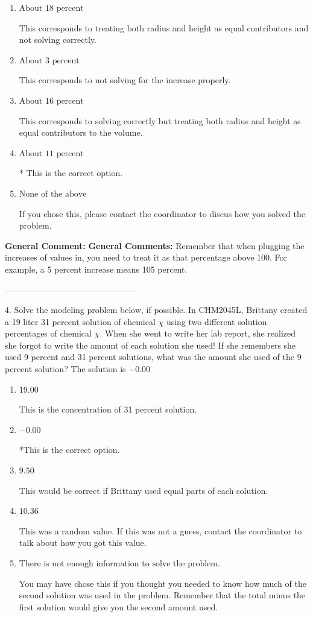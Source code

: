 \documentclass{extbook}[14pt]
\begin{document}
\begin{enumerate}[label=\Alph*.] 
\item $ \text{About } 18 \text{ percent} $ 

 This corresponds to treating both radius and height as equal contributors and not solving correctly. 
\item $ \text{About } 3 \text{ percent} $ 

 This corresponds to not solving for the increase properly. 
\item $ \text{About } 16 \text{ percent} $ 

 This corresponds to solving correctly but treating both radius and height as equal contributors to the volume. 
\item $ \text{About } 11 \text{ percent} $ 

 * This is the correct option. 
\item $ \text{None of the above} $ 

 If you chose this, please contact the coordinator to discus how you solved the problem. 
\end{enumerate} 
 
\textbf{General Comment:} \textbf{General Comments:} Remember that when plugging the increases of values in, you need to treat it as that percentage above 100. For example, a 5 percent increase means 105 percent. 

-----------------------------------------------

4. Solve the modeling problem below, if possible.
In CHM2045L, Brittany created a 19 liter 31 percent solution of chemical $\chi$ using two different solution percentages of chemical $\chi$. When she went to write her lab report, she realized she forgot to write the amount of each solution she used! If she remembers she used 9 percent and 31 percent solutions, what was the amount she used of the 9 percent solution? 
The solution is $ -0.00 $ 

\begin{enumerate}[label=\Alph*.] 
\item $ 19.00 $ 

 This is the concentration of 31 percent solution. 
\item $ -0.00 $ 

 *This is the correct option. 
\item $ 9.50 $ 

 This would be correct if Brittany used equal parts of each solution. 
\item $ 10.36 $ 

 This was a random value. If this was not a guess, contact the coordinator to talk about how you got this value. 
\item $ \text{There is not enough information to solve the problem.} $ 

 You may have chose this if you thought you needed to know how much of the second solution was used in the problem. Remember that the total minus the first solution would give you the second amount used. 
\end{enumerate} 
 
\end{document}
